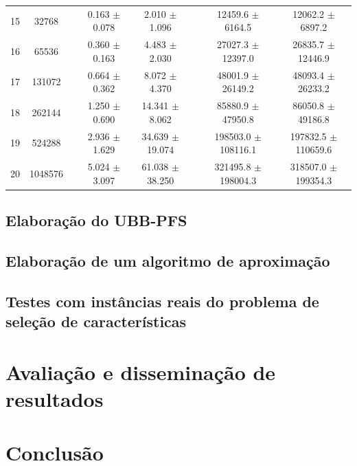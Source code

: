\documentclass[12pt]{article}
\begin{document}
\begin{table}
\begin{tabular}{cc c cc c cc}
15 &   32768 && 0.163 $\pm$ 0.078 & 2.010 $\pm$ 1.096 && 12459.6 $\pm$ 6164.5 & 12062.2 $\pm$ 6897.2 \\
16 &   65536 && 0.360 $\pm$ 0.163 & 4.483 $\pm$ 2.030 && 27027.3 $\pm$ 12397.0 & 26835.7 $\pm$ 12446.9 \\
17 &  131072 && 0.664 $\pm$ 0.362 & 8.072 $\pm$ 4.370 && 48001.9 $\pm$ 26149.2 & 48093.4 $\pm$ 26233.2 \\
18 &  262144 && 1.250 $\pm$ 0.690 & 14.341 $\pm$ 8.062 && 85880.9 $\pm$ 47950.8 & 86050.8 $\pm$ 49186.8 \\
19 &  524288 && 2.936 $\pm$ 1.629 & 34.639 $\pm$ 19.074 && 198503.0 $\pm$ 108116.1 & 197832.5 $\pm$ 110659.6 \\
20 & 1048576 && 5.024 $\pm$ 3.097 & 61.038 $\pm$ 38.250 && 321495.8 $\pm$ 198004.3 & 318507.0 $\pm$ 199354.3 \\
\bottomrule
\end{tabular}
\end{table}


\subsection{Elaboração do UBB-PFS}
\subsection{Elaboração de um algoritmo de aproximação}
\subsection{Testes com instâncias reais do problema de seleção de 
            características}
\section{Avaliação e disseminação de resultados}
\section{Conclusão}
\pagebreak
\end{document}
